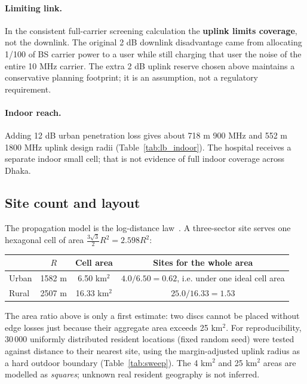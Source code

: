 \documentclass[9pt,a4paper]{extarticle}
\newcommand{\key}[1]{\textbf{#1}}
\begin{document}
\paragraph{Limiting link.} In the consistent full-carrier screening calculation the
\key{uplink limits coverage}, not the downlink. The original 2 dB downlink disadvantage
came from allocating 1/100 of BS carrier power to a user while still charging that
user the noise of the entire 10 MHz carrier. The extra 2 dB uplink reserve chosen
above maintains a conservative planning footprint; it is an assumption, not a
regulatory requirement.
\paragraph{Indoor reach.} Adding 12 dB urban penetration loss gives about
718 m 900 MHz and 552 m 1800 MHz uplink design radii
(Table~\ref{tab:lb_indoor}). The hospital receives a separate indoor small cell;
that is not evidence of full indoor coverage across Dhaka.

\subsection{Site count and layout}
The propagation model is the log-distance law~\cite{rappaport}. A three-sector site serves one hexagonal cell of area $\frac{3\sqrt3}{2}R^2 = 2.598R^2$:

\begin{center}\small
\begin{tabular}{@{}lccc@{}}
\toprule
& $R$ & Cell area & Sites for the whole area \\
\midrule
Urban & 1582 m & 6.50 km$^2$ & $4.0/6.50 = 0.62$, i.e. under one ideal cell area \\
Rural & 2507 m & 16.33 km$^2$ & $25.0/16.33 = 1.53$ \\
\bottomrule
\end{tabular}
\end{center}

The area ratio above is only a first estimate: two discs cannot be placed without
edge losses just because their aggregate area exceeds 25 km$^2$. For reproducibility,
30\,000 uniformly distributed resident locations (fixed random seed) were tested
against distance to their nearest site, using the margin-adjusted uplink radius as a
hard outdoor boundary (Table~\ref{tab:sweep}). The 4 km$^2$ and 25 km$^2$ areas
are modelled as \emph{squares}; unknown real resident geography is not inferred.
\end{document}
